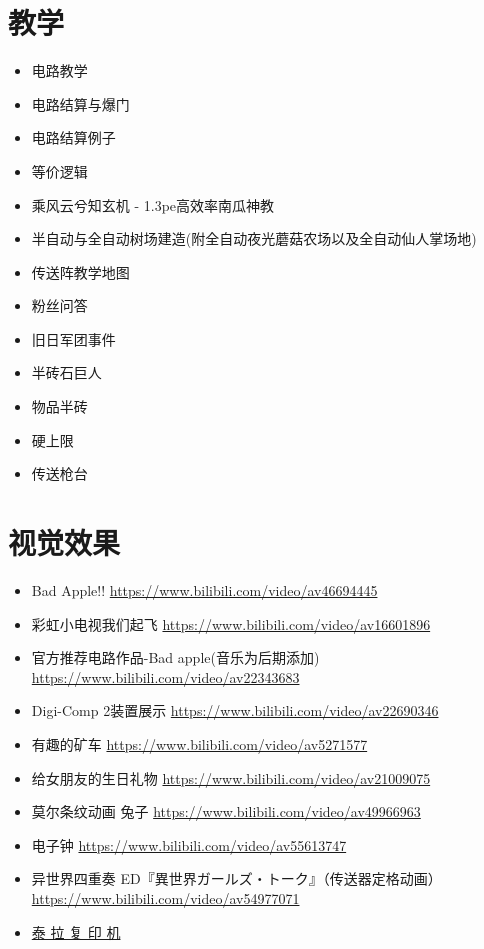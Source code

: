 \section{教学}
\begin{itemize}
\item {} 电路教学 
\item {} 电路结算与爆门 
\item {} 电路结算例子 
\item {} 等价逻辑 
\item 乘风云兮知玄机 - 1.3pe高效率南瓜神教 
\item {} 半自动与全自动树场建造(附全自动夜光蘑菇农场以及全自动仙人掌场地) 
\item {} 传送阵教学地图 
\item {} 粉丝问答  
\item {} 旧日军团事件  
\item {} 半砖石巨人  
\item {} 物品半砖  
\item {} 硬上限 
\item {} 传送枪台 
\end{itemize}

\section{视觉效果}
\begin{itemize}
\item Bad Apple!! \url{https://www.bilibili.com/video/av46694445}
\item 彩虹小电视我们起飞 \url{https://www.bilibili.com/video/av16601896}
\item 官方推荐电路作品-Bad apple(音乐为后期添加) \url{https://www.bilibili.com/video/av22343683}
\item Digi-Comp 2装置展示 \url{https://www.bilibili.com/video/av22690346}
\item 有趣的矿车 \url{https://www.bilibili.com/video/av5271577}
\item 给女朋友的生日礼物 \url{https://www.bilibili.com/video/av21009075}
\item 莫尔条纹动画 兔子 \url{https://www.bilibili.com/video/av49966963}
\item 电子钟 \url{https://www.bilibili.com/video/av55613747}
\item 异世界四重奏 ED『異世界ガールズ・トーク』（传送器定格动画） \url{https://www.bilibili.com/video/av54977071}
\item \href{https://www.bilibili.com/video/BV1ME411P7QD}{泰 拉 复 印 机}
\end{itemize}

